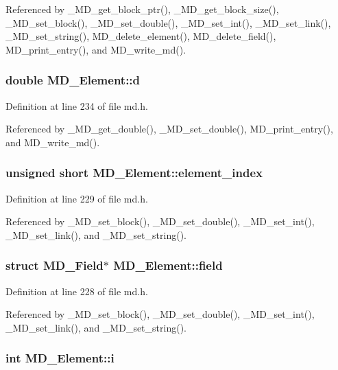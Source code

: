 Referenced by \_\-MD\_\-get\_\-block\_\-ptr(), \_\-MD\_\-get\_\-block\_\-size(), \_\-MD\_\-set\_\-block(), \_\-MD\_\-set\_\-double(), \_\-MD\_\-set\_\-int(), \_\-MD\_\-set\_\-link(), \_\-MD\_\-set\_\-string(), MD\_\-delete\_\-element(), MD\_\-delete\_\-field(), MD\_\-print\_\-entry(), and MD\_\-write\_\-md().
\subsubsection{\setlength{\rightskip}{0pt plus 5cm}double \bf{MD\_\-Element::d}}\label{structMD__Element_4c22e0781953214d175be9fbc577bee2}




Definition at line 234 of file md.h.

Referenced by \_\-MD\_\-get\_\-double(), \_\-MD\_\-set\_\-double(), MD\_\-print\_\-entry(), and MD\_\-write\_\-md().
\subsubsection{\setlength{\rightskip}{0pt plus 5cm}unsigned short \bf{MD\_\-Element::element\_\-index}}\label{structMD__Element_84484fc0ca476844d9716567c91ef04c}




Definition at line 229 of file md.h.

Referenced by \_\-MD\_\-set\_\-block(), \_\-MD\_\-set\_\-double(), \_\-MD\_\-set\_\-int(), \_\-MD\_\-set\_\-link(), and \_\-MD\_\-set\_\-string().
\subsubsection{\setlength{\rightskip}{0pt plus 5cm}struct \bf{MD\_\-Field}$\ast$ \bf{MD\_\-Element::field}}\label{structMD__Element_b8e4b998a803e592b563a929c9d931d6}




Definition at line 228 of file md.h.

Referenced by \_\-MD\_\-set\_\-block(), \_\-MD\_\-set\_\-double(), \_\-MD\_\-set\_\-int(), \_\-MD\_\-set\_\-link(), and \_\-MD\_\-set\_\-string().
\subsubsection{\setlength{\rightskip}{0pt plus 5cm}int \bf{MD\_\-Element::i}}\label{structMD__Element_d58b9b6b5a843589c362b6082777a01e}




